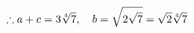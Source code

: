 \documentclass[preview]{standalone}
\begin{document}
\begin{align*}
\special{dvisvgm:raw <g id='unique000'>}\therefore a+c=3\sqrt[4]{7},\quad b=\sqrt{2\sqrt{7}}=\sqrt{2}\sqrt[4]{7}\special{dvisvgm:raw </g>}
\end{align*}
\end{document}
